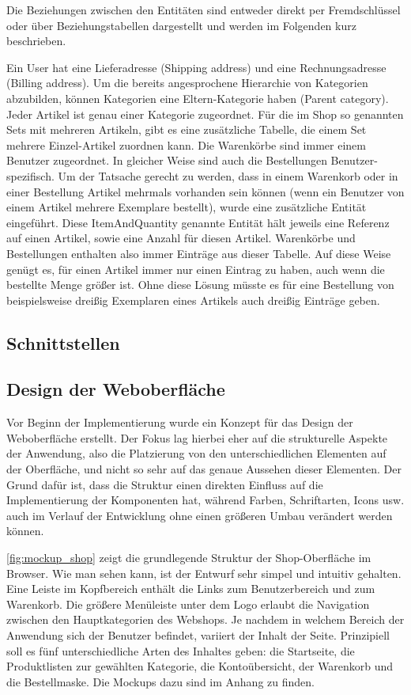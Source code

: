 Die Beziehungen zwischen den Entitäten sind entweder direkt per Fremdschlüssel oder über Beziehungstabellen dargestellt und werden im Folgenden kurz beschrieben.

Ein User hat eine Lieferadresse (Shipping address) und eine Rechnungsadresse (Billing address).
Um die bereits angesprochene Hierarchie von Kategorien abzubilden, können Kategorien eine Eltern-Kategorie haben (Parent category).
Jeder Artikel ist genau einer Kategorie zugeordnet. Für die im Shop so genannten Sets mit mehreren Artikeln, gibt es eine zusätzliche Tabelle, die einem Set mehrere Einzel-Artikel zuordnen kann.
Die Warenkörbe sind immer einem Benutzer zugeordnet. In gleicher Weise sind auch die Bestellungen Benutzer-spezifisch.
Um der Tatsache gerecht zu werden, dass in einem Warenkorb oder in einer Bestellung Artikel mehrmals vorhanden sein können (wenn ein Benutzer von einem Artikel mehrere Exemplare bestellt), wurde eine zusätzliche Entität eingeführt.
Diese ItemAndQuantity genannte Entität hält jeweils eine Referenz auf einen Artikel, sowie eine Anzahl für diesen Artikel.
Warenkörbe und Bestellungen enthalten also immer Einträge aus dieser Tabelle.
Auf diese Weise genügt es, für einen Artikel immer nur einen Eintrag zu haben, auch wenn die bestellte Menge größer ist.
Ohne diese Lösung müsste es für eine Bestellung von beispielsweise dreißig Exemplaren eines Artikels auch dreißig Einträge geben.

\subsection{Schnittstellen}

\subsection{Design der Weboberfläche}
Vor Beginn der Implementierung wurde ein Konzept für das Design der Weboberfläche erstellt. Der Fokus lag hierbei eher auf die strukturelle Aspekte der Anwendung, also die Platzierung von den unterschiedlichen Elementen auf der Oberfläche, und nicht so sehr auf das genaue Aussehen dieser Elementen. Der Grund dafür ist, dass die Struktur einen direkten Einfluss auf die Implementierung der Komponenten hat, während Farben, Schriftarten, Icons usw. auch im Verlauf der Entwicklung ohne einen größeren Umbau verändert werden können.

\cref{fig:mockup_shop} zeigt die grundlegende Struktur der Shop-Oberfläche im Browser. Wie man sehen kann, ist der Entwurf sehr simpel und intuitiv gehalten. Eine Leiste im Kopfbereich enthält die Links zum Benutzerbereich und zum Warenkorb. Die größere Menüleiste unter dem Logo erlaubt die Navigation zwischen den Hauptkategorien des Webshops. Je nachdem in welchem Bereich der Anwendung sich der Benutzer befindet, variiert der Inhalt der Seite. Prinzipiell soll es fünf unterschiedliche Arten des Inhaltes geben: die Startseite, die Produktlisten zur gewählten Kategorie, die Kontoübersicht, der Warenkorb und die Bestellmaske. Die Mockups dazu sind im Anhang zu finden. %

